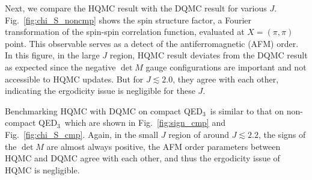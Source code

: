 \documentclass[aps,prl,twocolumn,superscriptaddress,showpacs,longbibliography]{revtex4-2}
\newcommand{\qed}{QED$_3$}
\newcommand{\reffg}[1]{\textmd{Fig.\ }\ref{#1}}
\begin{document}
Next, we compare the HQMC result with the DQMC result for various $J$. \reffg{fig:chi_S_noncmp} shows the spin  structure factor, a Fourier transformation of the spin-spin correlation function, evaluated at $X=(\pi, \pi)$ point. This observable serves as a detect of the antiferromagnetic (AFM) order. In this figure, in the large $J$ region, HQMC result deviates from the DQMC result as expected since the negative $\det M$ gauge configurations are important and not accessible to HQMC updates. But for $J\lesssim 2.0$, they agree with each other, indicating the ergodicity issue is negligible for these $J$. 

Benchmarking HQMC with DQMC on compact \qed\ is similar to that on non-compact \qed\, which are shown in \reffg{fig:sign_cmp} and \reffg{fig:chi_S_cmp}. Again, in the small $J$ region of around $J\lesssim 2.2$, the signs of the $\det M$ are almost always positive, the AFM order parameters between HQMC and DQMC agree with each other, and thus the ergodicity issue of HQMC is negligible. 
\end{document}
